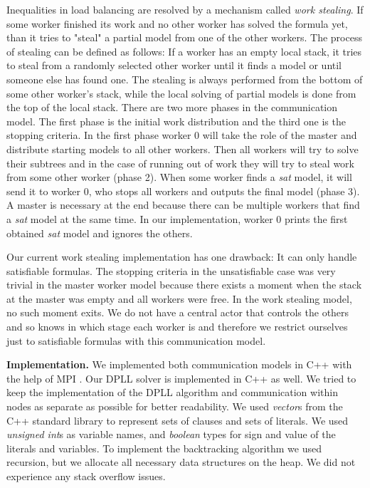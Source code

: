 \documentclass[letterpaper]{article}
\newcommand{\mypar}[1]{{\bf #1.}}
\begin{document}
Inequalities in load balancing are resolved by a mechanism called \textit{work stealing}.
If some worker finished its work and no other worker has solved the formula yet, than it tries to "steal" a partial model from one of the other workers.
The process of stealing can be defined as follows:
If a worker has an empty local stack, it tries to steal from a randomly selected other worker until it finds a model or until someone else has found one.
The stealing is always performed from the bottom of some other worker's stack, while the local solving of partial models is done from the top of the local stack.
There are two more phases in the communication model.
The first phase is the initial work distribution and the third one is the stopping criteria.
In the first phase worker 0 will take the role of the master and distribute starting models to all other workers.
Then all workers will try to solve their subtrees and in the case of running out of work they will try to steal work from some other worker (phase 2).
When some worker finds a \textit{sat} model, it will send it to worker 0, who stops all workers and outputs the final model (phase 3).
A master is necessary at the end because there can be multiple workers that find a \textit{sat} model at the same time.
In our implementation, worker 0 prints the first obtained \textit{sat} model and ignores the others.

Our current work stealing implementation has one drawback:
It can only handle satisfiable formulas.
The stopping criteria in the unsatisfiable case was very trivial in the master worker model because there exists a moment when the stack at the master was empty and all workers were free.
In the work stealing model, no such moment exits.
We do not have a central actor that controls the others and so knows in which stage each worker is and therefore we restrict ourselves just to satisfiable formulas with this communication model.

\mypar{Implementation}
We implemented both communication models in C++ with the help of MPI \cite{mpi}.
Our DPLL solver is implemented in C++ as well.
We tried to keep the implementation of the DPLL algorithm and communication within nodes as separate as possible for better readability.
We used \textit{vector}s from the C++ standard library to represent sets of clauses and sets of literals.
We used \textit{unsigned int}s as variable names, and \textit{boolean} types for sign and value of the literals and variables.
To implement the backtracking algorithm we used recursion, but we allocate all necessary data structures on the heap.
We did not experience any stack overflow issues.
\end{document}
